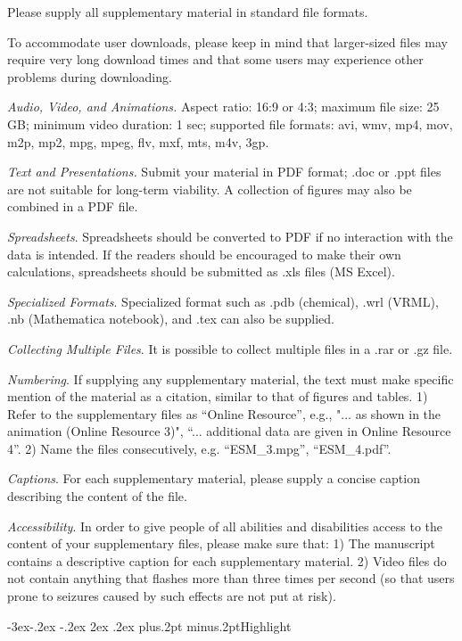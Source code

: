 \documentclass[twoside]{article}
\makeatletter
\def\subsection{\@startsection{subsection}{2}{\z@}%
 {-3ex\@plus -.2ex \@minus -.2ex}%
 {2ex \@plus.2ex}%
{\normalfont\normalsize\protect\baselineskip=12.5pt plus.2pt minus.2pt\bfseries}}
\makeatother
\begin{document}
\begin{multicols}{2}
Please supply all supplementary material in standard file formats.

To accommodate user downloads, please keep in mind that larger-sized files may require very long download times and that some users may experience other problems during downloading.

{\it Audio, Video, and Animations.} Aspect ratio: 16:9 or 4:3; maximum file size: 25 GB; minimum video duration: 1 sec; supported file formats: avi, wmv, mp4, mov, m2p, mp2, mpg, mpeg, flv, mxf, mts, m4v, 3gp.

{\it Text and Presentations.} Submit your material in PDF format; .doc or .ppt files are not suitable for long-term viability. A collection of figures may also be combined in a PDF file.

{\it Spreadsheets}. Spreadsheets should be converted to PDF if no interaction with the data is intended. If the readers should be encouraged to make their own calculations, spreadsheets should be submitted as .xls files (MS Excel).

{\it Specialized Formats}. Specialized format such as .pdb (chemical), .wrl (VRML), .nb (Mathematica notebook), and .tex can also be supplied.

{\it Collecting Multiple Files}. It is possible to collect multiple files in a .rar or .gz file.

{\it Numbering}. If supplying any supplementary material, the text must make specific mention of the material as a citation, similar to that of figures and tables. 1) Refer to the supplementary files as ``Online Resource'', e.g., "... as shown in the animation (Online Resource 3)", ``... additional data are given in Online Resource 4''. 2) Name the files consecutively, e.g. ``ESM{\_}3.mpg'', ``ESM{\_}4.pdf''.

{\it Captions}. For each supplementary material, please supply a concise caption describing the content of the file.

{\it Accessibility}. In order to give people of all abilities and disabilities access to the content of your supplementary files, please make sure that: 1) The manuscript contains a descriptive caption for each supplementary material. 2) Video files do not contain anything that flashes more than three times per second (so that users prone to seizures caused by such effects are not put at risk).

\subsection{Highlight}


\end{multicols}
\end{document}
